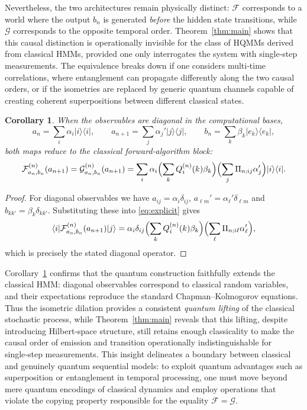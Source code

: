\documentclass[11pt, reco]{article}
\newtheorem{corollary}[theorem]{Corollary}
\begin{document}
Nevertheless, the two architectures remain physically distinct: $\mathcal{F}$ corresponds to a world where the output $b_n$ is generated \emph{before} the hidden state transitions, while $\mathcal{G}$ corresponds to the opposite temporal order.
Theorem~\ref{thm:main} shows that this causal distinction is operationally invisible for the class of HQMMs derived from classical HMMs, provided one only interrogates the system with single‑step measurements.
The equivalence breaks down if one considers multi‑time correlations, where entanglement can propagate differently along the two causal orders, or if the isometries are replaced by generic quantum channels capable of creating coherent superpositions between different classical states.

\begin{corollary}\label{cor:classical}
When the observables are diagonal in the computational bases,
\[
a_n=\sum_i\alpha_i|i\rangle\langle i|,\qquad
a_{n+1}=\sum_j\alpha_j'|j\rangle\langle j|,\qquad
b_n=\sum_k\beta_k|e_k\rangle\langle e_k|,
\]
both maps reduce to the classical forward‑algorithm block:
\[
\mathcal{F}_{a_n,b_n}^{(n)}(a_{n+1})
= \mathcal{G}_{a_n,b_n}^{(n)}(a_{n+1})
= \sum_i \alpha_i\Bigl(\sum_k Q^{(n)}_i(k)\beta_k\Bigr)
\Bigl(\sum_j\Pi_{n;ij}\alpha_j'\Bigr)|i\rangle\langle i|.
\]
\end{corollary}

\begin{proof}
For diagonal observables we have $a_{ij}=\alpha_i\delta_{ij}$, $a_{\ell m}'=\alpha_\ell'\delta_{\ell m}$ and $b_{kk'}=\beta_k\delta_{kk'}$.
Substituting these into \eqref{eq:explicit} gives
\[
\langle i|\mathcal{F}_{a_n,b_n}^{(n)}(a_{n+1})|j\rangle
= \alpha_i\delta_{ij}
\Bigl(\sum_k Q^{(n)}_i(k)\beta_k\Bigr)
\Bigl(\sum_\ell\Pi_{n;i\ell}\alpha_\ell'\Bigr),
\]
which is precisely the stated diagonal operator.
\end{proof}

Corollary~\ref{cor:classical} confirms that the quantum construction faithfully extends the classical HMM: diagonal observables correspond to classical random variables, and their expectations reproduce the standard Chapman–Kolmogorov equations.
Thus the isometric dilation provides a consistent \emph{quantum lifting} of the classical stochastic process, while Theorem~\ref{thm:main} reveals that this lifting, despite introducing Hilbert‑space structure, still retains enough classicality to make the causal order of emission and transition operationally indistinguishable for single‑step measurements.
This insight delineates a boundary between classical and genuinely quantum sequential models: to exploit quantum advantages such as superposition or entanglement in temporal processing, one must move beyond mere quantum encodings of classical dynamics and employ operations that violate the copying property responsible for the equality $\mathcal{F}=\mathcal{G}$.
\end{document}
